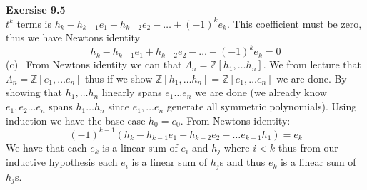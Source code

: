 \documentclass[12pt]{article}
\newenvironment{ques}[1]{\textbf{Exersise #1}\vspace{1 mm}\\ }{\bigskip}
\theoremstyle{definition}
\newcommand{\Z}{\mathbb Z}
\begin{document}
\begin{ques}{9.5}
	$t^k$ terms is $h_k - h_{k-1}e_1 + h_{k-2}e_2 - \dots + (-1)^ke_k$. This
	coefficient must be zero, thus we have Newtons identity
	$$h_k - h_{k-1}e_1 + h_{k-2}e_2 - \dots + (-1)^ke_k = 0$$
	(c) \ From Newtons identity we can that $\Lambda_n =
	\Z[h_1, \dots h_n]$. We from lecture that $\Lambda_n = \Z[e_1, \dots
	e_n]$ thus if we show $\Z[h_1, \dots h_n] = \Z[e_1 , \dots e_n]$ we are done.
	By showing that $h_1, \dots h_n$ linearly spans $e_1 \dots e_n$ we are done
	(we already know $e_1, e_2 \dots e_n$ spans $h_1 \dots h_n$ since $e_1,
	\dots e_n$ generate all symmetric polynomials). Using induction we have the
	base case $h_0 = e_0$. From Newtons identity:
	$$(-1)^{k-1}(h_k - h_{k-1}e_1 + h_{k-2}e_2 - \dots e_{k-1}h_1) = e_k$$
	We have that each $e_k$ is a linear sum of $e_i$ and $h_j$ where $i < k$
	thus from our inductive hypothesis each $e_i$ is a linear sum of
	$h_j$s and thus $e_k$ is a linear sum of $h_j$s. 
\end{ques}
\end{document}
